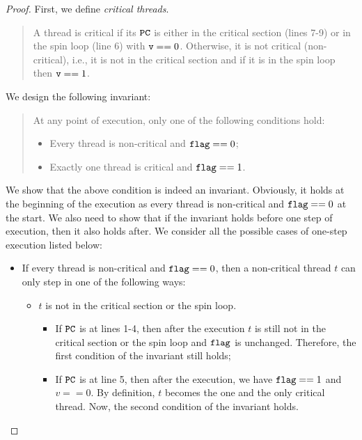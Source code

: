 \documentclass{article}[10pt]
\newcommand{\kwd}[1]{\ensuremath{\text{\ttfamily #1}}\xspace}
\def\kflag{\kwd{flag}}
\def\kv{\kwd{v}}
\begin{document}
\begin{proof}
  First, we define \emph{critical threads}. 
  \begin{quote}
    A thread is critical if its \kwd{PC} is either in the critical
    section (lines 7-9) or in the spin loop (line 6) with $\kv ==
    0$. Otherwise, it is not critical (non-critical), i.e., it is not in the critical
    section and if it is in the spin loop then $\kv == 1$.
  \end{quote}
  We design the following invariant:
  \begin{quote}
    At any point of execution, only one of the following conditions hold:
    \begin{itemize}
    \item Every thread is non-critical and $\kflag == 0$;
    \item Exactly one thread is critical and $\kflag == 1$.
    \end{itemize}
  \end{quote}
  We show that the above condition is indeed an
  invariant. Obviously, it holds at the beginning of the execution as
  every thread is non-critical and $\kflag == 0$ at the start. We also
  need to show that if the invariant holds before one step of
  execution, then it also holds after. We consider all the possible cases
  of one-step execution listed below:
  \begin{itemize}
  \item If every thread is non-critical and $\kflag == 0$, then a
    non-critical thread $t$ can only step in one of the following ways:
    \begin{itemize}
    \item $t$ is not in the critical section or the spin loop. 

      \begin{itemize}
      \item If \kwd{PC} is at lines 1-4, then after the execution $t$
        is still not in the critical section or the spin loop and
        \kflag is unchanged. Therefore, the first condition of the
        invariant still holds;

      \item If \kwd{PC} is at line 5, then after the execution, we
        have $\kflag == 1$ and $v == 0$. By definition, $t$ becomes
        the one and the only critical thread. Now, the second
        condition of the invariant holds.

      \end{itemize}



\end{itemize}
\end{itemize}
\end{proof}
\end{document}
